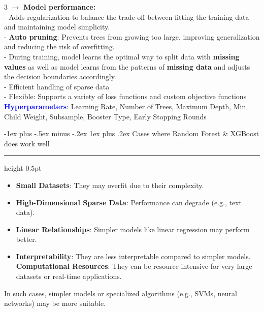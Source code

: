 \documentclass[letterpaper, 10.5pt,landscape]{article}
\makeatletter
\renewcommand{\subsubsection}{\@startsection{subsubsection}{3}{0mm}%
                                {-1ex plus -.5ex minus -.2ex}%
                                {1ex plus .2ex}%
                                {\normalfont\small\bfseries}}
\makeatother
\begin{document}
\begin{multicols*}{3}
$\rightarrow$ \textbf{Model performance: }  \\
\hspace{8pt}- Adds regularization to balance the trade-off between fitting the training data and maintaining model simplicity. \\
\hspace{8pt}- \textbf{Auto pruning}: Prevents trees from growing too large, improving generalization and reducing the risk of overfitting. \\
\hspace{8pt}- During training, model learns the optimal way to split data with \textbf{missing values} as well as model learns from the patterns of \textbf{missing data} and adjusts the decision boundaries accordingly.\\
\hspace{8pt}- Efficient handling of sparse data \\
\hspace{8pt}- Flexible: Supports a variety of loss functions and custom objective functions \\

\textbf{\textcolor{blue}{Hyperparameters}}: Learning Rate, Number of Trees, Maximum Depth, Min Child Weight, Subsample, Booster Type, Early Stopping Rounds


\subsubsection{Cases where Random Forest \& XGBoost does work well} {\color{teal}\hrule height 0.5pt} \smallskip
\begin{itemize}[leftmargin=0.4cm]
        \vspace{-2pt}
        \item \textbf{Small Datasets}: They may overfit due to their complexity.
        \vspace{-2pt}
        \item \textbf{High-Dimensional Sparse Data}: Performance can degrade (e.g., text data).
        \vspace{-2pt}
        \item \textbf{Linear Relationships}: Simpler models like linear regression may perform better.
        \vspace{-2pt}
        \item \textbf{Interpretability}: They are less interpretable compared to simpler models.
        \vspace{-2pt}
        \textbf{Computational Resources}: They can be resource-intensive for very large datasets or real-time applications.
    \end{itemize}
In such cases, simpler models or specialized algorithms (e.g., SVMs, neural networks) may be more suitable.



\end{multicols*}
\end{document}
